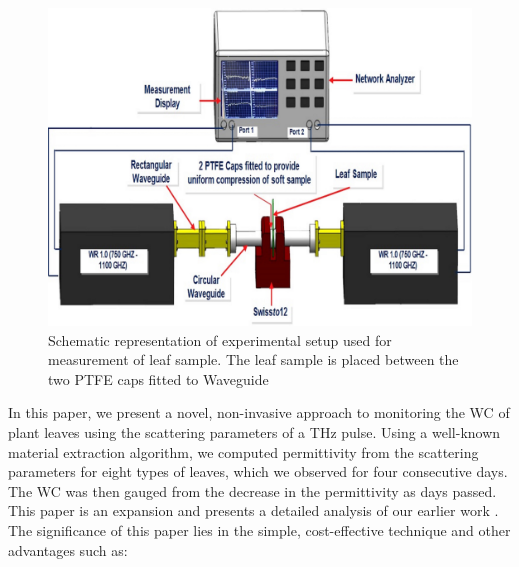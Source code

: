 \documentclass[journal,article,submit,moreauthors,pdftex]{Definitions/mdpi}
\renewcommand{\^}{\hat}  %
\begin{document}
\begin{figure}[t!]
	\centering
	\includegraphics [width=.65\linewidth]{setup8c.jpg}
	\caption{Schematic representation of experimental setup used for measurement of leaf sample. The leaf sample is placed between the two PTFE caps fitted to Waveguide}\label{fig:setup8c}
\end{figure}
In this paper, we present a novel, non-invasive approach to monitoring the WC of plant leaves using the scattering parameters of a THz pulse. Using a well-known material extraction algorithm, we computed permittivity from the scattering parameters for eight types of leaves, which we observed for four consecutive days. The WC was then gauged from the decrease in the permittivity as days passed. This paper is an expansion and presents a detailed analysis of our earlier work \cite{Zahid2018}. The significance of this paper lies in the simple, cost-effective technique and other advantages such as:
\end{document}
